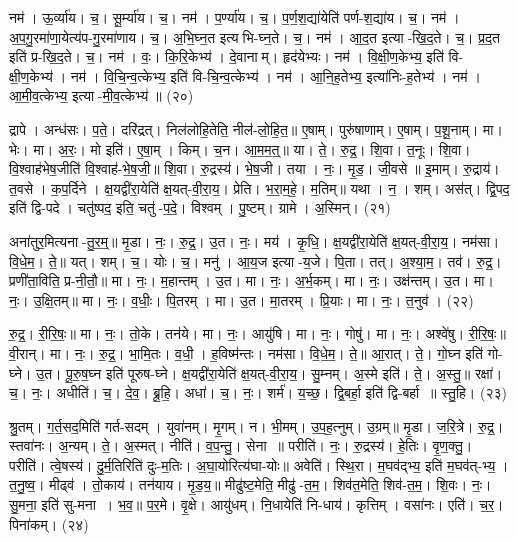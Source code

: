 नम॑। ऊ॒र्व्या॑य। च॒। सू॒र्म्या॑य। च॒। 
नम॑। प॒र्ण्या॑य। च॒। प॒र्ण॒श॒द्या॑येति॑ पर्ण-श॒द्या॑य। च॒। 
नम॑। अ॒प॒गु॒रमा॑णा॒येत्य॑प-गु॒रमा॑णाय। च॒। अ॒भि॒घ्न॒त इत्यभि-घ्न॒ते। च॒। 
नम॑। \mbox{आ॒\akhkhi{}द॒त} इत्या-खि॒द॒ते। च॒। \mbox{प्र॒\akhkhi{}द॒त} इति॑ प्र-खि॒द॒ते। च॒। 
नम॑। वः॒। कि॒रि॒केभ्य॑। दे॒वानाम्। हृद॑येभ्यः। नम॑। 
वि॒क्षी॒ण॒केभ्य॒ इति॑ वि-क्षी॒ण॒केभ्य॑। नम॑। वि॒चि॒न्व॒त्केभ्य॒ इति॑ वि-चि॒न्व॒त्केभ्य॑। नम॑। 
आ॒नि॒\ar{}ह॒तेभ्य॒ इत्या॑निः-ह॒तेभ्य॑। नम॑। आ॒मी॒व॒त्केभ्य॒ इत्या-मी॒व॒त्केभ्य॑॥ (२०)


द्रापे। अन्ध॑सः। प॒ते॒। दरि॑द्रत्। निल॑लोहि॒तेति॒ नील॑-लो॒हि॒त॒॥ 
ए॒षाम्। पुरु॑षाणाम्। ए॒षाम्। प॒शू॒नाम्। मा। भेः। मा। अ॒रः॒। मो इति॑। ए॒षा॒म्। किम्। च॒न। आ॒म॒म॒त्॒॥ 
या। ते॒। रु॒द्र॒। शि॒वा। त॒नूः। शि॒वा। वि॒श्वाह॑भेष॒जीति॑ वि॒श्वाह॑-भे॒ष॒जी॒॥ 
शि॒वा। रु॒द्रस्य॑। भे॒ष॒जी। तया। नः॒। मृ॒ड॒। जी॒वसे॥ 
इ॒माम्। रु॒द्राय॑। त॒वसे। क॒प॒र्दिने। क्ष॒यद्वी॑रा॒येति॑ क्ष॒यत्-वी॒रा॒य॒। प्रेति। भ॒रा॒म॒हे॒। म॒तिम्॥ 
यथा। न॒। शम्। अस॑त्। द्वि॒पद॒ इति॑ द्वि-पदे। चतु॑ष्पद॒ इति॒ चतु॑-प॒दे॒। विश्वम्। पु॒ष्टम्। ग्रामे। अ॒स्मिन्। (२१)


अना॑तुर॒मित्यना-तु॒र॒म्॒॥ 
मृ॒डा। नः॒। रु॒द्र॒। उ॒त। नः॒। मय॑। कृ॒धि॒। क्ष॒यद्वी॑रा॒येति॑ क्ष॒यत्-वी॒रा॒य॒। नम॑सा। वि॒धे॒म॒। ते॒॥ 
यत्। शम्। च॒। योः। च॒। मनु॑। आ॒य॒ज इत्या-य॒जे। पि॒ता। तत्। अ॒श्या॒म॒। तव॑। रु॒द्र॒। प्रणी॑ता॒विति॒ प्र-नी॒तौ॒॥ 
मा। नः॒। म॒हान्तम्। उ॒त। मा। नः॒। अ॒र्भ॒कम्। मा। नः॒। उक्ष॑न्तम्। उ॒त। मा। नः॒। उ॒क्षि॒तम्॥ 
मा। नः॒। व॒धीः॒। पि॒तरम्। मा। उ॒त। मा॒तरम्। प्रि॒याः। मा। नः॒। त॒नुव॑। (२२)


रु॒द्र॒। री॒रि॒षः॒॥ 
मा। नः॒। तो॒के। तन॑ये। मा। नः॒। आयु॑षि। मा। नः॒। गोषु॑। मा। नः॒। अश्वे॑षु। री॒रि॒षः॒॥ 
वी॒रान्। मा। नः॒। रु॒द्र॒। भा॒मि॒तः। व॒धी॒। ह॒विष्म॑न्तः। नम॑सा। वि॒धे॒म॒। ते॒॥ 
आ॒रात्। ते॒। गो॒घ्न इति॑ गो-घ्ने। उ॒त। पू॒रु॒ष॒घ्न इति॑ पूरुष-घ्ने। क्ष॒यद्वी॑रा॒येति॑ क्ष॒यत्-वी॒रा॒य॒। सु॒म्नम्। अ॒स्मे इति॑। ते॒। अ॒स्तु॒॥ 
रक्षा॑। च॒। नः॒। अधीति॑। च॒। दे॒व॒। ब्रू॒हि॒। अधा॑। च॒। नः॒। शर्म॑। य॒च्छ॒। द्वि॒बर्हा॒ इति॑ द्वि-बर्हा॥ 
स्तु॒हि। (२३)


श्रु॒तम्। ग॒र्त॒सद॒मिति॑ गर्त-सदम्। युवा॑नम्। मृ॒गम्। न। भी॒मम्। उ॒प॒ह॒त्नुम्। उ॒ग्रम्॥ 
मृ॒डा। ज॒रि॒त्रे। रु॒द्र॒। स्तवा॑नः। अ॒न्यम्। ते॒। अ॒स्मत्। नीति॑। व॒प॒न्तु॒। सेना॥ 
परीति॑। नः॒। रु॒द्रस्य॑। हे॒तिः। वृ॒ण॒क्तु॒। परीति॑। त्वे॒षस्य॑। दु॒र्म॒तिरिति॑ दुः-म॒तिः। अ॒घा॒योरित्य॑घा-योः॥ 
अवेति॑। स्थि॒रा। म॒घव॑द्भ्य॒ इति॑ म॒घव॑त्-भ्य॒। त॒नु॒ष्व॒। मीढ्व॑। तो॒काय॑। तन॑याय। मृ॒ड॒य॒॥ 
मीढु॑ष्ट॒मेति॒ मीढु॑-त॒म॒। शिव॑त॒मेति॒ शिव॑-त॒म॒। शि॒वः। नः॒। सु॒मना॒ इति॑ सु-मना। भ॒व॒॥ 
प॒र॒मे। वृ॒क्षे। आयु॑धम्। नि॒धायेति॑ नि-धाय॑। कृत्तिम्। वसा॑नः। एति॑। च॒र॒। पिना॑कम्। (२४)


